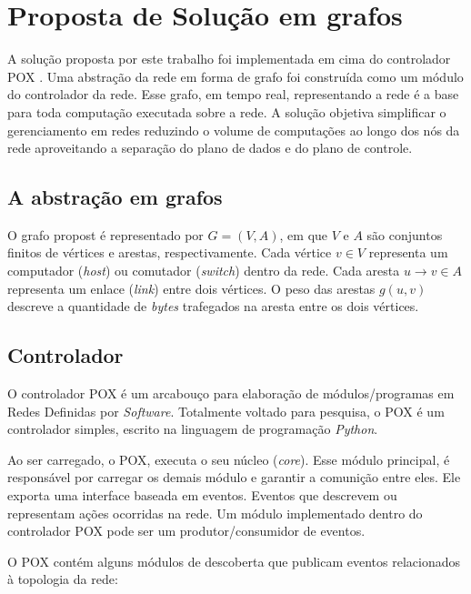 \chapter{Proposta de Solução em grafos}

A solução proposta por este trabalho foi implementada em cima do controlador
POX \citep{pox2015}. 
Uma abstração da rede em forma de grafo foi construída como um módulo 
do controlador da rede.
Esse grafo, em tempo real, representando a rede é a base para toda computação
executada sobre a rede.
A solução objetiva simplificar o gerenciamento em redes reduzindo o volume 
de computações ao longo dos nós da rede aproveitando a separação do plano 
de dados e do plano de controle.

\section{A abstração em grafos}

O grafo propost é representado por $G=(V, A)$, em que $V$ e $A$ são conjuntos
finitos de vértices e arestas, respectivamente.
Cada vértice $v \in V$ representa um computador (\emph{host}) ou comutador
(\emph{switch}) dentro da rede.
Cada aresta $u \to v \in A$ representa um enlace (\emph{link}) entre dois
vértices.
O peso das arestas $g(u, v)$ descreve a quantidade de \emph{bytes} trafegados
na aresta entre os dois vértices.

\section{Controlador}
\label{sec:controller}

O controlador POX é um arcabouço para elaboração de módulos/programas 
em Redes Definidas por \emph{Software}.
Totalmente voltado para pesquisa, o POX é um controlador simples, 
escrito na linguagem de programação \emph{Python}.

Ao ser carregado, o POX, executa o seu núcleo (\emph{core}). 
Esse módulo principal, é responsável por carregar os demais 
módulo e garantir a comunição entre eles.
Ele exporta uma interface baseada em eventos. 
Eventos que descrevem ou representam ações ocorridas na rede.
Um módulo implementado dentro do controlador POX pode ser um 
produtor/consumidor de eventos.

O POX contém alguns módulos de descoberta que publicam eventos relacionados
à topologia da rede:

